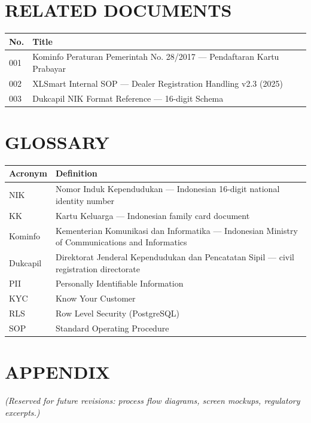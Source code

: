 \documentclass[12pt,a4paper]{article}
\begin{document}
\newpage

\section{RELATED DOCUMENTS}

\begin{longtable}{|p{2cm}|p{11cm}|}
\hline
\textbf{No.} & \textbf{Title} \\
\hline
001 & Kominfo Peraturan Pemerintah No. 28/2017 — Pendaftaran Kartu Prabayar \\
\hline
002 & XLSmart Internal SOP — Dealer Registration Handling v2.3 (2025) \\
\hline
003 & Dukcapil NIK Format Reference — 16-digit Schema \\
\hline
\end{longtable}

\vspace{1cm}

\section{GLOSSARY}

\begin{longtable}{|p{3cm}|p{10cm}|}
\hline
\textbf{Acronym} & \textbf{Definition} \\
\hline
NIK & Nomor Induk Kependudukan --- Indonesian 16-digit national identity number \\
\hline
KK & Kartu Keluarga --- Indonesian family card document \\
\hline
Kominfo & Kementerian Komunikasi dan Informatika --- Indonesian Ministry of Communications and Informatics \\
\hline
Dukcapil & Direktorat Jenderal Kependudukan dan Pencatatan Sipil --- civil registration directorate \\
\hline
PII & Personally Identifiable Information \\
\hline
KYC & Know Your Customer \\
\hline
RLS & Row Level Security (PostgreSQL) \\
\hline
SOP & Standard Operating Procedure \\
\hline
\end{longtable}

\newpage

\section*{APPENDIX}

\textit{(Reserved for future revisions: process flow diagrams, screen mockups, regulatory excerpts.)}
\end{document}
